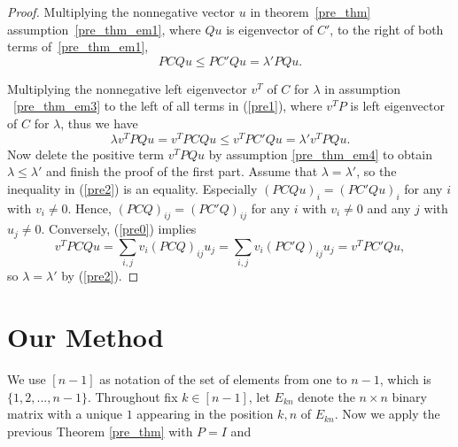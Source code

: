 \documentclass[12pt, a4paper]{article}
\theoremstyle{plain}
\theoremstyle{definition}
\begin{document}
\begin{proof}
    Multiplying the nonnegative vector $u$ in theorem~\ref{pre_thm}
     assumption~\ref{pre_thm_em1},
     where $Qu$ is eigenvector of $C'$, 
     to the right of both terms of~\ref{pre_thm_em1},
    \begin{equation}\label{pre1}
       PCQu\leq PC'Qu=\lambda'PQu.
    \end{equation}

    Multiplying the nonnegative left eigenvector $v^T$ of $C$ for $\lambda$ in assumption
     ~\ref{pre_thm_em3} to the left of all terms  in (\ref{pre1}),
      where $v^TP$ is left eigenvector of $C$ for $\lambda$, thus we have
    \begin{equation}\label{pre2}
        \lambda v^TPQu=v^TPCQu\leq v^TPC'Qu=\lambda' v^TPQu.
    \end{equation}
        Now delete the positive term $v^TPQu$ by assumption \ref{pre_thm_em4} to obtain
        $\lambda\leq \lambda'$ and finish the proof of the first part.
        Assume that $\lambda=\lambda'$, so the inequality in (\ref{pre2}) is an equality.
        Especially $(PCQu)_i=(PC'Qu)_i$ for any $i$ with $v_i\not=0.$ Hence,
        $(PCQ)_{ij}=(PC'Q)_{ij}$ for any $i$ with $v_i\not=0$ and any $j$ with
        $u_j\not=0.$ Conversely, (\ref{pre0}) implies $$v^TPCQu=\sum_{i,j} v_i(PCQ)_{ij}u_j=
         \sum_{i,j} v_i(PC'Q)_{ij}u_j=v^TPC'Qu,$$ so $\lambda=\lambda'$ by (\ref{pre2}).
\end{proof}

\section{Our Method}


We use $[n-1]$ as notation of the set of elements from one to $n-1$, which is $\{1,2,...,n-1\}$.
Throughout fix $k\in [n-1]$, let $E_{kn}$ denote the $n\times n$ binary matrix with a unique $1$
appearing in the position $k,n$ of $E_{kn}$. Now we apply the previous Theorem \ref{pre_thm} with $P=I$ and
\end{document}
